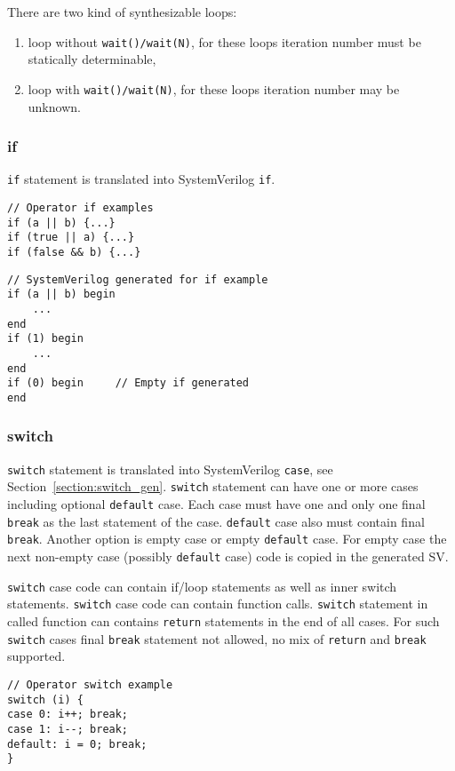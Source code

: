 There are two kind of synthesizable loops:
\begin{enumerate}
\item loop without {\tt wait()/wait(N)}, for these loops iteration number must be statically determinable,
\item loop with {\tt wait()/wait(N)}, for these loops iteration number may be unknown.
\end{enumerate}


\subsubsection{if}

{\tt if} statement is translated into SystemVerilog {\tt if}. 

\begin{lstlisting}[style=mycpp]
// Operator if examples
if (a || b) {...}
if (true || a) {...}
if (false && b) {...}
\end{lstlisting}
%
\begin{lstlisting}[style=myverilog]
// SystemVerilog generated for if example
if (a || b) begin 
    ... 
end
if (1) begin 
    ... 
end
if (0) begin     // Empty if generated
end
\end{lstlisting}

\subsubsection{switch}

{\tt switch} statement is translated into SystemVerilog {\tt case}, see Section~\ref{section:switch_gen}.
{\tt switch} statement can have one or more cases including optional {\tt default} case. Each case must have one and only one final {\tt break} as the last statement of the case. {\tt default} case also must contain final {\tt break}. Another option is empty case or empty {\tt default} case. For empty case the next non-empty case (possibly {\tt default} case) code is copied in the generated SV.

{\tt switch} case code can contain if/loop statements as well as inner switch statements. {\tt switch} case code can contain function calls. {\tt switch} statement in called function can contains {\tt return} statements in the end of all cases. For such {\tt switch} cases final {\tt break} statement not allowed, no mix of {\tt return} and {\tt break} supported.

\begin{lstlisting}[style=mycpp]
// Operator switch example
switch (i) {
case 0: i++; break;
case 1: i--; break;
default: i = 0; break;
}
\end{lstlisting}


